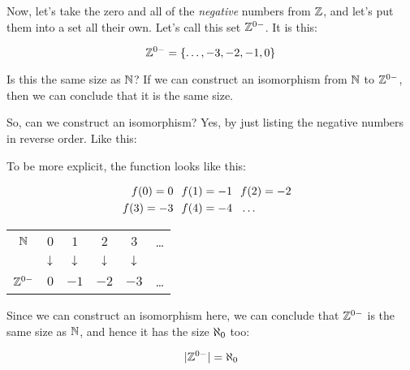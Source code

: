 \documentclass[../../../main.tex]{subfiles}
\begin{document}
\begin{example}

Now, let's take the zero and all of the \emph{negative} numbers from $\Ints/$, and let's put them into a set all their own. Let's call this set $\NegativeIntsAndZero/$. It is this:

\begin{equation*}
  \NegativeIntsAndZero/ = \{ \ldots, -3, -2, -1, 0 \}
\end{equation*}

Is this the same size as $\Nats/$? If we can construct an isomorphism from $\Nats/$ to $\NegativeIntsAndZero/$, then we can conclude that it is the same size. 

So, can we construct an isomorphism? Yes, by just listing the negative numbers in reverse order. Like this:

\begin{aside}
  \begin{remark}
    To be more explicit, the function looks like this:
    
    \begin{align*}
      f(0) = 0 \hskip 0.25cm
      &f(1) = -1 \hskip 0.25cm
      f(2) = -2 \hskip 0.25cm
      \\
      f(3) = -3 \hskip 0.25cm
      &f(4) = -4 \hskip 0.25cm
      \ldots
    \end{align*}
  \end{remark}
\end{aside}

\begin{center}
  \begin{tabular}{ c c c c c c }
    $\Nats/$                & $0$   & $1$   & $2$   & $3$   & \ldots \\
                            & $\v/$ & $\v/$ & $\v/$ & $\v/$ &        \\ 
    $\NegativeIntsAndZero/$ & $0$   & $-1$  & $-2$  & $-3$  & \ldots
  \end{tabular}
\end{center}

Since we can construct an isomorphism here, we can conclude that $\NegativeIntsAndZero/$ is the same size as $\Nats/$, and hence it has the size $\AlephZero/$ too:

\begin{equation*}
  \cardinality{\NegativeIntsAndZero/} = \AlephZero/
\end{equation*}

\end{example}
\end{document}
